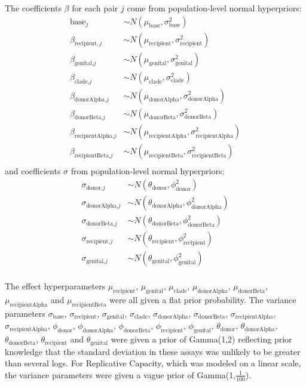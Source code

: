 \documentclass[12pt]{article}
\begin{document}
The coefficients $\beta$ for each pair $j$ come from population-level normal hyperpriors:
\begin{align*}
\text{base}_{j} & \sim  N(\mu_{\text{base}},\sigma^2_{\text{base}})\\
\beta_{\text{recipient},j} & \sim  N(\mu_{\text{recipient}},\sigma^2_{\text{recipient}})\\
\beta_{\text{genital,}j} & \sim  N(\mu_{\text{genital}},\sigma^2_{\text{genital}})\\
\beta_{\text{clade,}j} & \sim  N(\mu_{\text{clade}},\sigma^2_{\text{clade}}) \\
\beta_{\text{donorAlpha,}j} & \sim  N(\mu_{\text{donorAlpha}},\sigma^2_{\text{donorAlpha}}) \\
\beta_{\text{donorBeta,}j} & \sim  N(\mu_{\text{donorBeta}},\sigma^2_{\text{donorBeta}}) \\
\beta_{\text{recipientAlpha,}j} & \sim  N(\mu_{\text{recipientAlpha}},\sigma^2_{\text{recipientAlpha}}) \\
\beta_{\text{recipientBeta,}j} & \sim  N(\mu_{\text{recipientBeta}},\sigma^2_{\text{recipientBeta}}) \\
\end{align*}
and coefficients $\sigma$ from population-level normal hyperpriors:
\begin{align*}
\sigma_{\text{donor,}j} & \sim  N(\theta_\text{donor},\phi^2_\text{donor})\\
\sigma_{\text{donorAlpha,}j} & \sim  N(\theta_\text{donorAlpha},\phi^2_\text{donorAlpha})\\
\sigma_{\text{donorBeta,}j} & \sim  N(\theta_\text{donorBeta},\phi^2_\text{donorBeta})\\
\sigma_{\text{recipient,}j} & \sim  N(\theta_\text{recipient},\phi^2_\text{recipient})\\
\sigma_{\text{genital,}j} & \sim  N(\theta_\text{genital},\phi^2_\text{genital})\\
\end{align*}

The effect hyperparameters
$\mu_{\text{recipient}}$, $\mu_{\text{genital}}$, $\mu_{\text{clade}}$, $\mu_{\text{donorAlpha}}$, $\mu_{\text{donorBeta}}$, $\mu_{\text{recipientAlpha}}$ and $\mu_{\text{recipientBeta}}$ were all given a flat prior probability.
The variance parameters 
$\sigma_{\text{base}}$, $\sigma_{\text{recipient}}$, $\sigma_{\text{genital}}$, $\sigma_{\text{clade}}$, $\sigma_{\text{donorAlpha}}$, $\sigma_{\text{donorBeta}}$, $\sigma_{\text{recipientAlpha}}$, $\sigma_{\text{recipientAlpha}}$,
$\phi_{\text{donor}}$, $\phi_{\text{donorAlpha}}$, $\phi_{\text{donorBeta}}$, $\phi_{\text{recipient}}$, $\phi_{\text{genital}}$,
$\theta_{\text{donor}}$, $\theta_{\text{donorAlpha}}$, $\theta_{\text{donorBeta}}$, $\theta_{\text{recipient}}$ and $\theta_{\text{genital}}$ 
were given a prior of Gamma(1,2) reflecting prior knowledge that the standard deviation in these assays was unlikely to be greater than several logs. For Replicative Capacity, which was modeled on a linear scale, the variance parameters were given a vague prior of Gamma(1,$\frac{1}{100}$).
\end{document}
